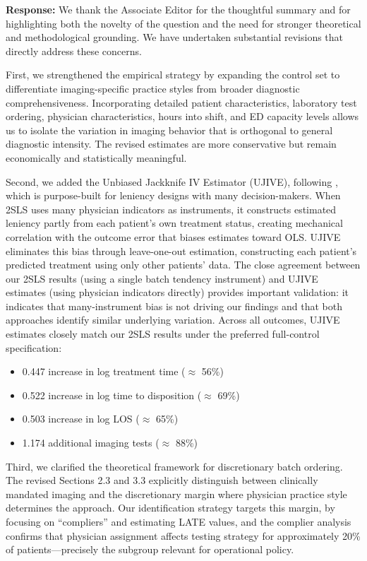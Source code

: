 \documentclass[11pt]{article}
\newcommand{\1}{\hbox{\rm 1\kern-.35em 1}}
\begin{document}
\noindent\textbf{Response:}
\color{blue}We thank the Associate Editor for the thoughtful summary and for highlighting both the novelty of the question and the need for stronger theoretical and methodological grounding. We have undertaken substantial revisions that directly address these concerns.

First, we strengthened the empirical strategy by expanding the control set to differentiate imaging-specific practice styles from broader diagnostic comprehensiveness. Incorporating detailed patient characteristics, laboratory test ordering, physician characteristics, hours into shift, and ED capacity levels allows us to isolate the variation in imaging behavior that is orthogonal to general diagnostic intensity. The revised estimates are more conservative but remain economically and statistically meaningful.

Second, we added the Unbiased Jackknife IV Estimator (UJIVE), following \citet{goldsmithpinkham2025leniencydesignsoperatorsmanual}, which is purpose-built for leniency designs with many decision-makers. When 2SLS uses many physician indicators as instruments, it constructs estimated leniency partly from each patient's own treatment status, creating mechanical correlation with the outcome error that biases estimates toward OLS. UJIVE eliminates this bias through leave-one-out estimation, constructing each patient's predicted treatment using only other patients' data. The close agreement between our 2SLS results (using a single batch tendency instrument) and UJIVE estimates (using physician indicators directly) provides important validation: it indicates that many-instrument bias is not driving our findings and that both approaches identify similar underlying variation. Across all outcomes, UJIVE estimates closely match our 2SLS results under the preferred full-control specification:

\begin{itemize}
\item 0.447 increase in log treatment time ($\approx$ 56\%)
\item 0.522 increase in log time to disposition ($\approx$ 69\%)
\item 0.503 increase in log LOS ($\approx$ 65\%)
\item 1.174 additional imaging tests ($\approx$ 88\%)
\end{itemize}

Third, we clarified the theoretical framework for discretionary batch ordering. The revised Sections 2.3 and 3.3 explicitly distinguish between clinically mandated imaging and the discretionary margin where physician practice style determines the approach. Our identification strategy targets this margin, by focusing on ``compliers'' and estimating LATE values, and the complier analysis confirms that physician assignment affects testing strategy for approximately 20\% of patients---precisely the subgroup relevant for operational policy.
\end{document}
